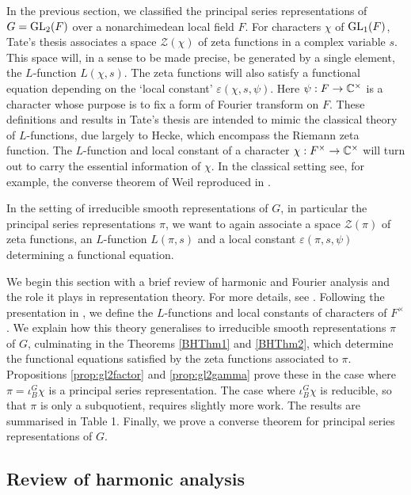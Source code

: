 In the previous section, we classified the principal series representations of $G=\mathrm{GL}_2(F)$ over a nonarchimedean local field $F$. For characters $\chi$ of $\mathrm{GL}_1(F)$, Tate's thesis \cite{Tate} associates a space $\mathcal Z(\chi)$ of zeta functions in a complex variable $s$. This space will, in a sense to be made precise, be generated by a single element, the $L$-function $L(\chi,s)$. The zeta functions will also satisfy a functional equation depending on the `local constant' $\varepsilon(\chi,s,\psi)$. Here $\psi :F \to \mathbb{C}^\times$ is a character whose purpose is to fix a form of Fourier transform on $F$. These definitions and results in Tate's thesis are intended to mimic the classical theory of $L$-functions, due largely to Hecke, which encompass the Riemann zeta function. The $L$-function and local constant of a character $\chi:F^\times \to \mathbb{C}^\times$ will turn out to carry the essential information of $\chi$. In the classical setting see, for example, the converse theorem of Weil reproduced in \cite[Theorem 1.5.1]{Bump}.

In the setting of irreducible smooth representations of $G$, in particular the principal series representations $\pi$, we want to again associate a space $\mathcal Z(\pi)$ of zeta functions, an $L$-function $L(\pi,s)$ and a local constant $\varepsilon(\pi,s,\psi)$ determining a functional equation. 

We begin this section with a brief review of harmonic and Fourier analysis and the role it plays in representation theory. For more details, see \cite[Chapter 3.1]{Bump}. Following the presentation in \cite{BH1}, we define the $L$-functions and local constants of characters of $F^\times$. We explain how this theory generalises to irreducible smooth representations $\pi$ of $G$, culminating in the Theorems \ref{BHThm1} and \ref{BHThm2}, which determine the functional equations satisfied by the zeta functions associated to $\pi$. Propositions \ref{prop:gl2factor} and \ref{prop:gl2gamma} prove these in the case where $\pi = \iota_B^G \chi$ is a principal series representation. The case where $\iota_B^G \chi$ is reducible, so that $\pi$ is only a subquotient, requires slightly more work. The results are summarised in Table 1. Finally, we prove a converse theorem for principal series representations of $G$.


\subsection{Review of harmonic analysis}

